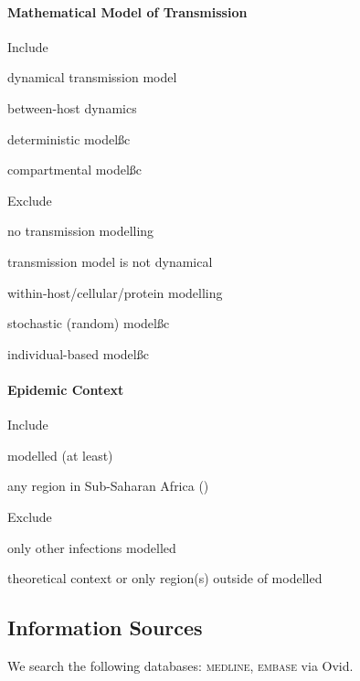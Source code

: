 \documentclass{article}
\begin{document}
\paragraph{Mathematical Model of Transmission}\n
\begin{criteria}{Include}
  \item dynamical transmission model\footnotemark[1]
  \item between-host dynamics
  \item deterministic model\ss{c}
  \item compartmental model\ss{c}
\end{criteria}
\begin{criteria}{Exclude}
  \item no transmission modelling
  \item transmission model is not dynamical
  \item within-host/cellular/protein modelling
  \item stochastic (random) model\ss{c}
  \item individual-based model\ss{c}
\end{criteria}
\paragraph{Epidemic Context}\n
\begin{criteria}{Include}
  \item \hiv modelled (at least)
  \item any region in Sub-Saharan Africa (\ssa)
\end{criteria}
\begin{criteria}{Exclude}
  \item only other infections modelled
  \item theoretical context or only region(s) outside of \ssa modelled
\end{criteria}
\clearpage %
\subsection{Information Sources}
We search the following databases: \textsc{medline}, \textsc{embase} via Ovid.
\end{document}
